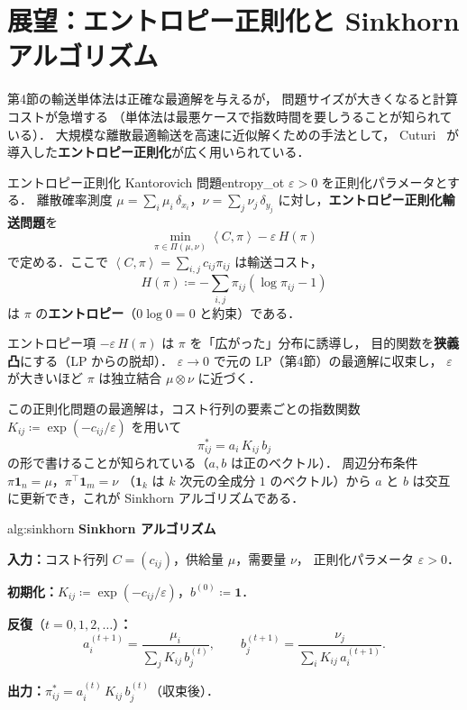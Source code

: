\documentclass[uplatex, dvipdfmx]{jsarticle}
\begin{document}
\section{展望：エントロピー正則化と Sinkhorn アルゴリズム}

第4節の輸送単体法は正確な最適解を与えるが，
問題サイズが大きくなると計算コストが急増する
（単体法は最悪ケースで指数時間を要しうることが知られている）．
大規模な離散最適輸送を高速に近似解くための手法として，
Cuturi~\cite{Cuturi2013} が導入した\textbf{エントロピー正則化}が広く用いられている．

\begin{definition}{エントロピー正則化 Kantorovich 問題}{entropy_ot}
$\varepsilon>0$ を正則化パラメータとする．
離散確率測度 $\mu=\sum_i \mu_i\,\delta_{x_i}$，$\nu=\sum_j\nu_j\,\delta_{y_j}$
に対し，\textbf{エントロピー正則化輸送問題}を
\[
  \min_{\pi\in\Pi(\mu,\nu)}
  \left\langle C,\pi\right\rangle
  - \varepsilon\,H(\pi)
\]
で定める．ここで $\left\langle C,\pi\right\rangle=\sum_{i,j}c_{ij}\pi_{ij}$ は輸送コスト，
\[
  H(\pi) \coloneqq -\sum_{i,j}\pi_{ij}(\log\pi_{ij}-1)
\]
は $\pi$ の\textbf{エントロピー}（$0\log 0=0$ と約束）である．
\end{definition}

エントロピー項 $-\varepsilon\,H(\pi)$ は $\pi$ を「広がった」分布に誘導し，
目的関数を\textbf{狭義凸}にする（LP からの脱却）．
$\varepsilon\to 0$ で元の LP（第4節）の最適解に収束し，
$\varepsilon$ が大きいほど $\pi$ は独立結合 $\mu\otimes\nu$ に近づく．

この正則化問題の最適解は，コスト行列の要素ごとの指数関数
$K_{ij}\coloneqq\exp(-c_{ij}/\varepsilon)$ を用いて
\[
  \pi^*_{ij} = a_i\,K_{ij}\,b_j
\]
の形で書けることが知られている（$a,b$ は正のベクトル）．
周辺分布条件 $\pi\mathbf{1}_n=\mu$，$\pi^\top\mathbf{1}_m=\nu$
（$\mathbf{1}_k$ は $k$ 次元の全成分 $1$ のベクトル）から
$a$ と $b$ は交互に更新でき，これが Sinkhorn アルゴリズムである．

\begin{algorithm}{alg:sinkhorn}
\textbf{Sinkhorn アルゴリズム}

\medskip
\textbf{入力：}コスト行列 $C=(c_{ij})$，供給量 $\mu$，需要量 $\nu$，
正則化パラメータ $\varepsilon>0$．

\medskip
\textbf{初期化：}$K_{ij}\coloneqq\exp(-c_{ij}/\varepsilon)$，$b^{(0)}\coloneqq\mathbf{1}$．

\medskip
\textbf{反復}（$t=0,1,2,\ldots$）\textbf{：}
\[
  a^{(t+1)}_i = \frac{\mu_i}{\sum_j K_{ij}\,b^{(t)}_j},
  \qquad
  b^{(t+1)}_j = \frac{\nu_j}{\sum_i K_{ij}\,a^{(t+1)}_i}.
\]

\textbf{出力：}$\pi^*_{ij}=a_i^{(t)}\,K_{ij}\,b_j^{(t)}$（収束後）．
\end{algorithm}
\end{document}
